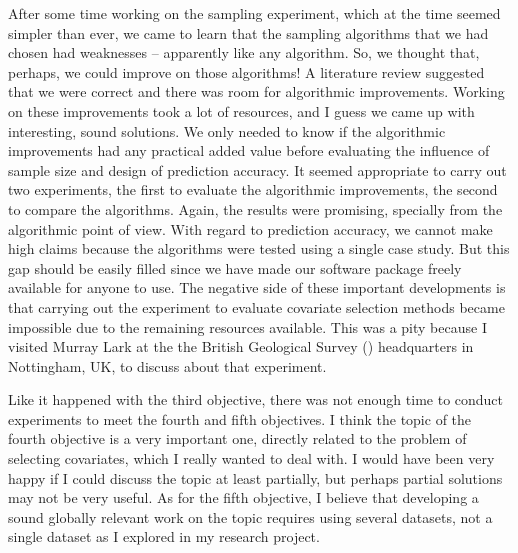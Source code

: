 After some time working on the sampling experiment, which at the time seemed simpler than ever, we came to 
learn that the sampling algorithms that we had chosen had weaknesses -- apparently like any algorithm. So, we 
thought that, perhaps, we could improve on those algorithms! A literature review suggested that we were correct 
and there was room for algorithmic improvements. Working on these improvements took a lot of resources, and I 
guess we came up with interesting, sound solutions. We only needed to know if the algorithmic improvements had 
any practical added value before evaluating the influence of sample size and design of prediction accuracy. It 
seemed appropriate to carry out two experiments, the first to evaluate the algorithmic improvements, the second 
to compare the algorithms. Again, the results were promising, specially from the algorithmic point of view. 
With regard to prediction accuracy, we cannot make high claims because the algorithms were tested using a 
single case study. But this gap should be easily filled since we have made our software package freely 
available for anyone to use. The negative side of these important developments is that carrying out the 
experiment to evaluate covariate selection methods became impossible due to the remaining resources available. 
This was a pity because I visited Murray Lark at the the British Geological Survey (\bgs) headquarters in 
Nottingham, UK, to discuss about that experiment.

Like it happened with the third objective, there was not enough time to conduct experiments to meet the 
fourth and fifth objectives. I think the topic of the fourth objective is a very important one, directly 
related to the problem of selecting covariates, which I really wanted to deal with. I would 
have been very happy if I could discuss the topic at least partially, but perhaps partial solutions may not be 
very useful. As for the fifth objective, I believe that developing a sound globally relevant work on the topic 
requires using several datasets, not a single dataset as I explored in my research project.

